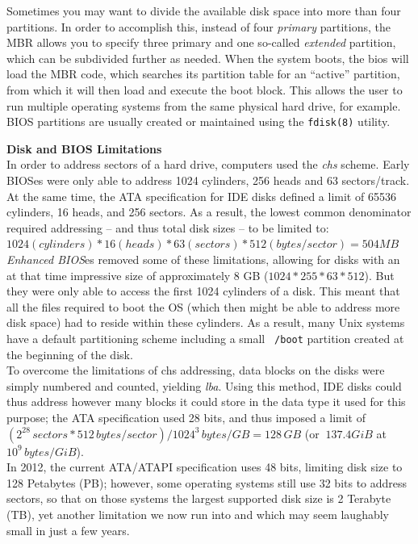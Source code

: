 Sometimes you may want to divide the available disk
space into more than four partitions.  In order to
accomplish this, instead of four {\em primary}
partitions, the MBR allows you to specify three
primary and one so-called {\em extended} partition,
which can be subdivided further as needed.  When the
system boots, the \gls{bios} will load the MBR code, which
searches its partition table for an ``active''
partition, from which it will then load and execute
the boot block.  This allows the user to run multiple
operating systems from the same physical hard drive,
for example.  BIOS partitions are usually created or
maintained using the {\tt fdisk(8)}
utility.

\begin{sidenote}
{\bf Disk and BIOS Limitations} \\

In order to address sectors of a hard drive, computers
used the {\em
\gls{chs}}
scheme.  Early BIOSes were only able to address 1024
cylinders, 256 heads and 63 sectors/track.  At the
same time, the ATA specification for IDE disks defined
a limit of 65536 cylinders, 16 heads, and 256 sectors.
As a result, the lowest common denominator required
addressing -- and thus total disk sizes -- to be
limited to:\\ [10pt]

$1024 (cylinders) * 16 (heads) * 63 (sectors) * 512 (bytes / sector) = 504 MB $ \\[10pt]

{\em Enhanced BIOS}es removed some of these
limitations, allowing for disks with an at that time
impressive size of approximately 8 GB ($1024 * 255 *
63 * 512$).  But they were only able to access the
first 1024 cylinders of a disk.  This meant that all
the files required to boot the OS (which then might be
able to address more disk space) had to reside within
these cylinders.  As a result, many Unix systems have
a default partitioning scheme including a small {\tt
/boot} partition created at the beginning of the disk.
\\ [10pt]

To overcome the limitations of
\gls{chs}
addressing, data blocks on the disks were simply
numbered and counted, yielding {\em
\gls{lba}}.  Using
this method, IDE disks could thus address however many
blocks it could store in the data type it used for
this purpose; the ATA specification used 28 bits, and
thus imposed a limit of $(2^{28}\,sectors * 512\,
bytes/sector)/1024^3\, bytes/GB = 128\, GB$ (or
$~137.4GiB$ at $10^9\, bytes/GiB$). \\ [10pt]

In 2012, the current ATA/ATAPI
specification uses 48 bits, limiting disk size to 128
Petabytes (PB); however, some operating systems still
use 32 bits to address sectors, so that on those
systems the largest supported disk size is 2 Terabyte
(TB), yet another limitation we now run into and which
may seem laughably small in just a few years.
\end{sidenote}


